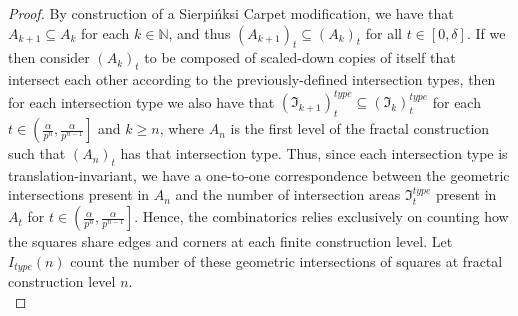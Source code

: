 \documentclass{article}
\theoremstyle{plain}
\numberwithin{equation}{section}
\numberwithin{table}{section}
\numberwithin{figure}{section}
\begin{document}
\begin{proof}
By construction of a Sierpi\'nksi Carpet modification, we have that $A_{k+1} \subseteq A_k$ for each $k \in \mathbb{N}$, and thus $(A_{k+1})_t \subseteq (A_k)_t$ for all $t \in [0,\delta]$. If we then consider $(A_k)_t$ to be composed of scaled-down copies of itself that intersect each other according to the previously-defined intersection types, then for each intersection type we also have that $(\mathfrak{I}_{k+1})_t^{type} \subseteq (\mathfrak{I}_k)_t^{type}$ for each $t \in \left(\frac{\alpha}{p^n},\frac{\alpha}{p^{n-1}}\right]$ and $k \geq n$, where $A_n$ is the first level of the fractal construction such that $(A_n)_t$ has that intersection type. Thus, since each intersection type is translation-invariant, we have a one-to-one correspondence between the geometric intersections present in $A_n$ and the number of intersection areas $\mathfrak{I}_t^{type}$ present in $A_t$ for $t \in \left(\frac{\alpha}{p^n},\frac{\alpha}{p^{n-1}}\right]$. Hence, the combinatorics relies exclusively on counting how the squares share edges and corners at each finite construction level. Let $I_{type}(n)$ count the number of these geometric intersections of squares at fractal construction level $n$. \\


\end{proof}
\end{document}
